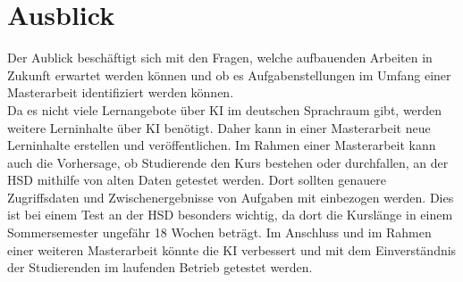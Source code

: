 \chapter{Ausblick}
Der Aublick beschäftigt sich mit den Fragen, welche aufbauenden Arbeiten in Zukunft erwartet werden können und ob es Aufgabenstellungen im Umfang einer Masterarbeit identifiziert werden können.
\\ \noindent
Da es nicht viele Lernangebote über \ac{KI} im deutschen Sprachraum gibt, werden weitere Lerninhalte über \ac{KI} benötigt. Daher kann in einer Masterarbeit neue Lerninhalte erstellen und veröffentlichen.
Im Rahmen einer Masterarbeit kann auch die Vorhersage, ob Studierende den Kurs bestehen oder durchfallen, an der HSD mithilfe von alten Daten getestet werden.
Dort sollten genauere Zugriffsdaten und Zwischenergebnisse von Aufgaben mit einbezogen werden. Dies ist bei einem Test an der HSD besonders wichtig, da dort die Kurslänge in einem Sommersemester ungefähr 18 Wochen beträgt.
Im Anschluss und im Rahmen einer weiteren Masterarbeit könnte die KI verbessert und mit dem Einverständnis der Studierenden im laufenden Betrieb getestet werden.
